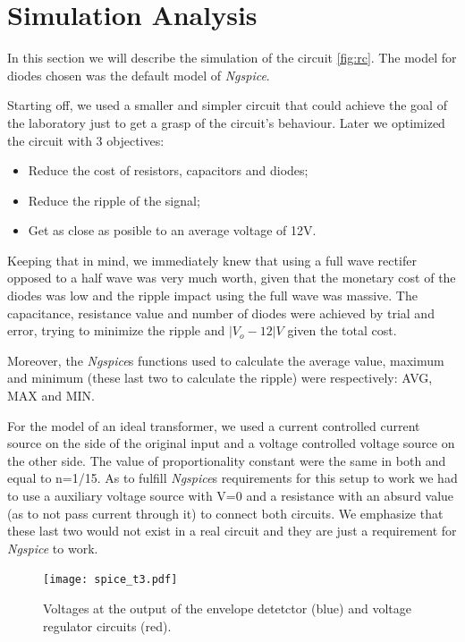 \section{Simulation Analysis}
\label{sec:simulation}

In this section we will describe the simulation of the circuit \ref{fig:rc}.
The model for diodes chosen was the default model of \emph{Ngspice}.

Starting off, we used a smaller and simpler circuit that could achieve
the goal of the laboratory just to get a grasp of the circuit's behaviour.
Later we optimized the circuit with 3 objectives:
\begin{itemize}
  \item Reduce the cost of resistors, capacitors and diodes;
  \item Reduce the ripple of the signal;
  \item Get as close as posible to an average voltage of 12V.
\end{itemize}
Keeping that in mind, we immediately knew that using a full wave rectifer opposed to a half wave
was very much worth, given that the monetary cost of the diodes was low and the ripple impact using the full wave was massive.
The capacitance, resistance value and number of diodes were achieved by trial and error, trying to minimize the
ripple and $|V_{o}-12|V$ given the total cost.

Moreover, the \emph{Ngspice}\textquotesingle s functions used to calculate the average value, maximum and minimum (these last two to calculate the ripple)
were respectively: AVG, MAX and MIN.

For the model of an ideal transformer, we used a current controlled current source on the side of the original input
and a voltage controlled voltage source on the other side.
The value of proportionality constant were the same in both and equal to n=1/15.
As to fulfill \emph{Ngspice}\textquotesingle s requirements for this setup to work we had to use a auxiliary voltage source with V=0
and a resistance with an absurd value (as to not pass current through it) to connect both circuits. We
emphasize that these last two would not exist in a real circuit and they are just a requirement for \emph{Ngspice} to work.

\begin{figure}[h] \centering
  \texttt{[image: spice\_t3.pdf]}
  \caption{Voltages at the output of the envelope detetctor (blue) and voltage regulator circuits (red).}
  \label{fig:11}
\end{figure}

